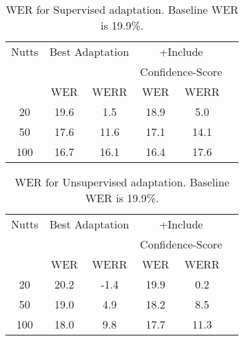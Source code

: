 \begin{table}
\begin{center}
\begin{small}
\caption{WER for Supervised adaptation. Baseline WER is 19.9\%.} \label{tab:mean-FA-diff}
\begin{tabular}{|c|c|c|c|c|c|}
\hline
Nutts &  \multicolumn{2}{|c|}{Best Adaptation} & \multicolumn{2}{|c|}{+Include} \\
&  \multicolumn{2}{|c|}{ }  & \multicolumn{2}{|c|}{Confidence-Score} \\
\hline
 &   WER & WERR & WER & WERR\\
\hline
20 &  19.6  & 1.5  & 18.9 & 5.0\\
50 &  17.6  & 11.6  & 17.1 & 14.1\\
100 &  16.7  & 16.1  & 16.4 & 17.6\\
\hline
\end{tabular}
\end{small}
\end{center}
\end{table}

\begin{table}
\begin{center}
\begin{small}
\caption{WER for Unsupervised adaptation. Baseline WER is 19.9\%.} \label{tab:mean-FA-diff}
\begin{tabular}{|c|c|c|c|c|c|}
\hline
Nutts &  \multicolumn{2}{|c|}{Best Adaptation} & \multicolumn{2}{|c|}{+Include} \\
&  \multicolumn{2}{|c|}{ }  & \multicolumn{2}{|c|}{Confidence-Score} \\
\hline
 &   WER & WERR & WER & WERR\\
\hline
20 &  20.2  & -1.4  & 19.9 & 0.2\\
50 &  19.0  & 4.9  & 18.2 & 8.5\\
100 &  18.0  & 9.8  & 17.7 & 11.3\\
\hline
\end{tabular}
\end{small}
\end{center}
\end{table}
